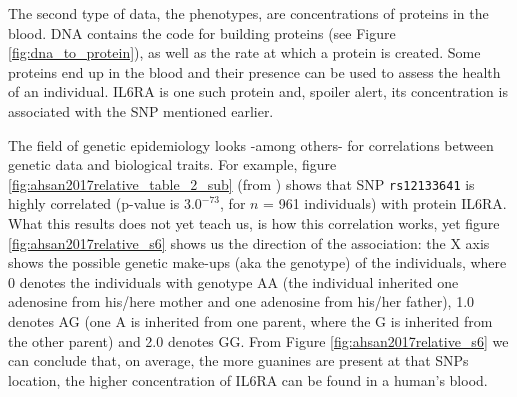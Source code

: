 The second type of data, the phenotypes, 
are concentrations of proteins in the blood. 
DNA contains the code for building proteins (see Figure 
\ref{fig:dna_to_protein}), 
as well as the rate
at which a protein is created. Some proteins end up in the blood and
their presence can be used to assess the health of an individual.
IL6RA is one such protein and, spoiler alert, its concentration
is associated with the SNP mentioned earlier.

The field of genetic epidemiology looks -among others- for
correlations between genetic data and biological traits.
For example, figure \ref{fig:ahsan2017relative_table_2_sub} 
(from \cite{ahsan2017relative}) shows that
SNP \verb|rs12133641| is highly correlated (p-value is $3.0^{-73}$, 
for $n$ = 961 individuals) with protein IL6RA. What this results does
not yet teach us, is how this correlation works, yet
figure \ref{fig:ahsan2017relative_s6} shows us the direction of the association:
the X axis shows the possible genetic make-ups (aka the genotype) of the individuals,
where 0 denotes the individuals with genotype
AA (the individual inherited one adenosine 
from his/here mother and one adenosine from his/her father), 
1.0 denotes AG (one A is inherited from one parent, 
where the G is inherited from the other parent) and 2.0 denotes GG.
From Figure \ref{fig:ahsan2017relative_s6} we can conclude that, on average,
the more guanines are present at that SNPs location,
the higher concentration of IL6RA can be found in a human's blood.

